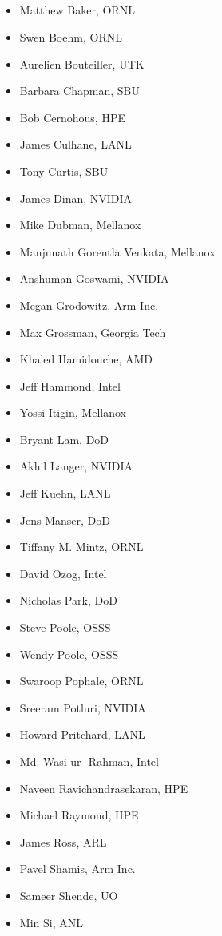 \subsection*{}
\begin{multicols}{2}
\begin{itemize}
\setlength\itemsep{0.1em}
\item Matthew Baker, \ac{ORNL}
\item Swen Boehm, \ac{ORNL}
\item Aurelien Bouteiller, \ac{UTK}
\item Barbara Chapman, \ac{SBU}
\item Bob Cernohous, \ac{HPE}
\item James Culhane, \ac{LANL}
\item Tony Curtis, \ac{SBU}
\item James Dinan, NVIDIA
\item Mike Dubman, Mellanox
\item Manjunath Gorentla Venkata, Mellanox
\item Anshuman Goswami, NVIDIA
\item Megan Grodowitz, Arm Inc.
\item Max Grossman, Georgia Tech
\item Khaled Hamidouche, \ac{AMD}
\item Jeff Hammond, Intel
\item Yossi Itigin, Mellanox
\item Bryant Lam, \ac{DoD}
\item Akhil Langer, NVIDIA
\item Jeff Kuehn, \ac{LANL}
\item Jens Manser, \ac{DoD}
\item Tiffany M. Mintz, \ac{ORNL}
\item David Ozog, Intel
\item Nicholas Park, \ac{DoD}
\item Steve Poole, \ac{OSSS}
\item Wendy Poole, \ac{OSSS}
\item Swaroop Pophale, \ac{ORNL}
\item Sreeram Potluri, NVIDIA
\item Howard Pritchard, \ac{LANL}
\item Md. Wasi-ur- Rahman, Intel
\item Naveen Ravichandrasekaran, \ac{HPE}
\item Michael Raymond, \ac{HPE}
\item James Ross, \ac{ARL}
\item Pavel Shamis, Arm Inc.
\item Sameer Shende, \ac{UO}
\item Min Si, \ac{ANL}
\end{itemize}
\end{multicols}

